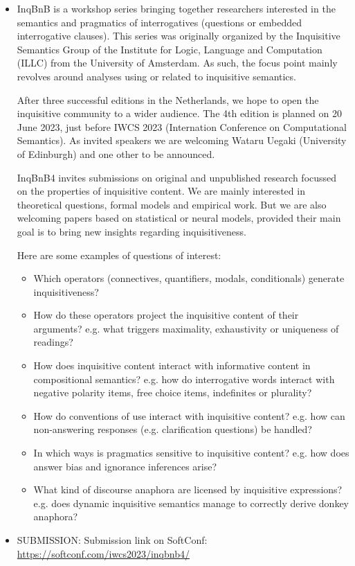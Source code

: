 \documentclass[prodmode,acmtecs]{acmsmall} %
\begin{document}
\begin{itemize}\item  InqBnB is a workshop series bringing together researchers interested in the semantics and pragmatics of interrogatives (questions or embedded interrogative clauses). This series was originally organized by the Inquisitive Semantics Group of the Institute for Logic, Language and Computation (ILLC) from the University of Amsterdam. As such, the focus point mainly revolves around analyses using or related to inquisitive semantics. 
 
  After three successful editions in the Netherlands, we hope to open the inquisitive community to a wider audience. The 4th edition is planned on 20 June 2023, just before IWCS 2023 (Internation Conference on Computational Semantics). As invited speakers we are welcoming Wataru Uegaki (University of Edinburgh) and one other to be announced. 
 
  InqBnB4 invites submissions on original and unpublished research focussed on the properties of inquisitive content. We are mainly interested in theoretical questions, formal models and empirical work. But we are also welcoming papers based on statistical or neural models, provided their main goal is to bring new insights regarding inquisitiveness. 
 
  Here are some examples of questions of interest:  
 
\begin{itemize}\item  Which operators (connectives, quantifiers, modals, conditionals) generate inquisitiveness? 
\item  How do these operators project the inquisitive content of their arguments? e.g. what triggers maximality, exhaustivity or uniqueness of readings? 
\item  How does inquisitive content interact with informative content in compositional semantics? e.g. how do interrogative words interact with negative polarity items, free choice items, indefinites or plurality? 
\item  How do conventions of use interact with inquisitive content? e.g. how can non-answering responses (e.g. clarification questions) be handled? 
\item  In which ways is pragmatics sensitive to inquisitive content? e.g. how does answer bias and ignorance inferences arise? 
\item  What kind of discourse anaphora are licensed by inquisitive expressions? e.g. does dynamic inquisitive semantics manage to correctly derive donkey anaphora?
\end{itemize} 
\item  SUBMISSION: Submission link on SoftConf: \href{https://softconf.com/iwcs2023/inqbnb4/}{https://softconf.com/iwcs2023/inqbnb4/} 
 

\end{itemize}
\end{document}
